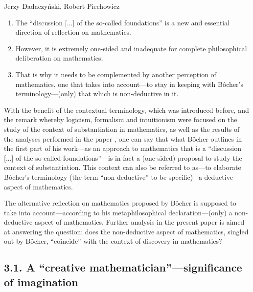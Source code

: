 \begin{artengenv}{Jerzy Dadaczyński, Robert Piechowicz}
\begin{enumerate}
\item The ``discussion [...] of the so-called foundations'' is a new and essential direction of reflection on mathematics.
\item However, it is extremely one-sided and inadequate for complete philosophical deliberation on mathematics;
\item That is why it needs to be complemented by another perception of mathematics, one that takes into account---to stay in keeping with Bôcher's terminology---(only) that which is non-deductive in it.
\end{enumerate}
With the benefit of the contextual terminology, which was introduced before, and the remark whereby logicism, formalism and intuitionism were focused on the study of the context of substantiation in mathematics, as well as the results of the analyses performed in the paper
\parencite[][]{dadaczynski_tendencje_2015},
 one can say that what Bôcher outlines in the first part of his work---as an approach to mathematics that is a ``discussion [...] of the so-called foundations''---is in fact a (one-sided) proposal to study the context of substantiation. This context can also be referred to as---to elaborate Bôcher's terminology (the term ``non-deductive'' to be specific) –a deductive aspect of mathematics.

The alternative reflection on mathematics proposed by Bôcher is supposed to take into account---according to his metaphilosophical declaration---(only) a non-deductive aspect of mathematics. Further analysis in the present paper is aimed at answering the question: does the non-deductive aspect of mathematics, singled out by Bôcher, ``coincide'' with the context of discovery in mathematics?

\subsection{3.1. A ``creative mathematician''---significance of imagination}


\end{artengenv}
